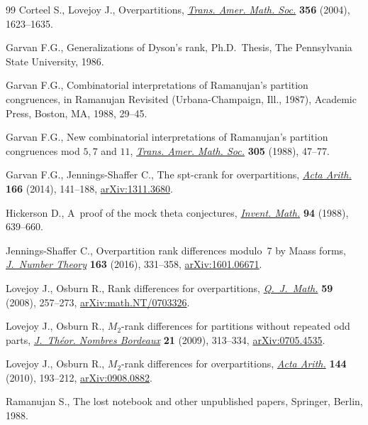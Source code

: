 \documentclass[pdftex]{sigma}
\numberwithin{equation}{section}
\begin{document}
\begin{thebibliography}{99}
Corteel S., Lovejoy J., Overpartitions, \href{https://doi.org/10.1090/S0002-9947-03-03328-2}{\textit{Trans. Amer. Math. Soc.}}
  \textbf{356} (2004), 1623--1635.

Garvan F.G., Generalizations of {D}yson's rank, Ph.D.~Thesis, {T}he
  Pennsylvania State University, 1986.

Garvan F.G., Combinatorial interpretations of {R}amanujan's partition
  congruences, in Ramanujan Revisited ({U}rbana-{C}hampaign, {I}ll., 1987),
  Academic Press, Boston, MA, 1988, 29--45.

Garvan F.G., New combinatorial interpretations of {R}amanujan's partition
  congruences mod {$5,7$} and {$11$}, \href{https://doi.org/10.2307/2001040}{\textit{Trans. Amer. Math. Soc.}}
  \textbf{305} (1988), 47--77.

Garvan F.G., Jennings-Shaffer C., The spt-crank for overpartitions,
  \href{https://doi.org/10.4064/aa166-2-3}{\textit{Acta Arith.}} \textbf{166} (2014), 141--188, \href{https://arxiv.org/abs/1311.3680}{arXiv:1311.3680}.

Hickerson D., A~proof of the mock theta conjectures, \href{https://doi.org/10.1007/BF01394279}{\textit{Invent. Math.}}
  \textbf{94} (1988), 639--660.

Jennings-Shaffer C., Overpartition rank differences modulo~7 by {M}aass forms,
  \href{https://doi.org/10.1016/j.jnt.2015.11.018}{\textit{J.~Number Theory}} \textbf{163} (2016), 331--358, \href{https://arxiv.org/abs/1601.06671}{arXiv:1601.06671}.

Lovejoy J., Osburn R., Rank differences for overpartitions,
  \href{https://doi.org/10.1093/qmath/ham031}{\textit{Q.~J.~Math.}} \textbf{59} (2008), 257--273, \href{https://arxiv.org/abs/math.NT/0703326}{arXiv:math.NT/0703326}.

Lovejoy J., Osburn R., {$M_2$}-rank differences for partitions without repeated
  odd parts, \href{https://doi.org/10.5802/jtnb.673}{\textit{J.~Th\'eor. Nombres Bordeaux}} \textbf{21} (2009),
  313--334, \href{https://arxiv.org/abs/0705.4535}{arXiv:0705.4535}.

Lovejoy J., Osburn R., {$M_2$}-rank differences for overpartitions,
  \href{https://doi.org/10.4064/aa144-2-8}{\textit{Acta Arith.}} \textbf{144} (2010), 193--212, \href{https://arxiv.org/abs/0908.0882}{arXiv:0908.0882}.

Ramanujan S., The lost notebook and other unpublished papers, Springer, Berlin,
  1988.

\end{thebibliography}\LastPageEnding
\end{document}
